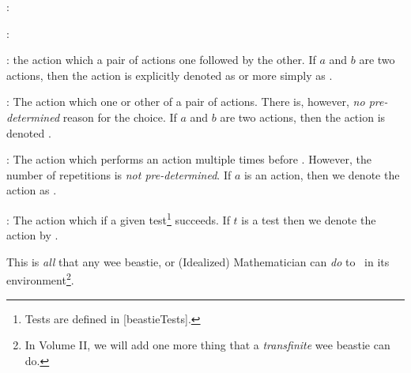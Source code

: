 \item {}:

\stopitemize

\item {}

\startitemize[n]

\item {}: 

\stopitemize

\stopitemize

\item {}

\startitemize[n]

\item {}: the action which  a pair of 
actions one followed by the other. If $a$ and $b$ are two actions, then 
the  action is explicitly denoted as 
 or more simply as . 

\item {}: The action which  
one or other of a pair of actions. There is, however, \emph{no 
pre-determined} reason for the choice. If $a$ and $b$ are two actions, 
then the  action is denoted 
. 

\item {}: The action which performs an action 
multiple times before . However, the number of 
repetitions is \emph{not pre-determined}. If $a$ is an action, then we 
denote the  action as 
. 

\item {}: The action which  if a given 
test\footnote{Tests are defined in [beastieTests].} 
succeeds. If $t$ is a test then we denote the  action by 
. 

\stopitemize

\stopitemize

\noindent This is \emph{all} that any wee beastie, or (Idealized) 
Mathematician can \emph{do} to \lols\ in its environment\footnote{In 
Volume II, we will add one more thing that a \emph{transfinite} wee 
beastie can do.}. 

\stopDefinition

